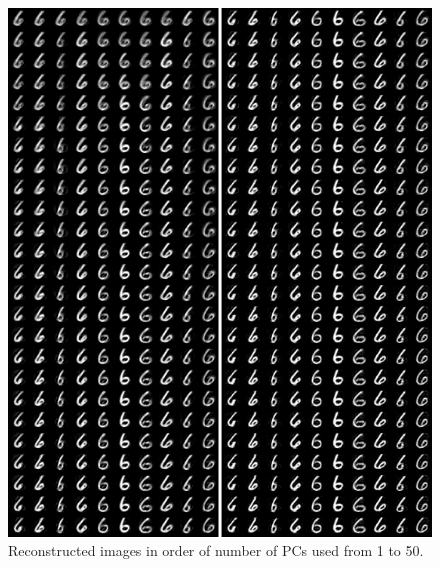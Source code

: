 \documentclass[a4paper,11pt,twocolumn]{article}
\begin{document}
\begin{figure}[!h]
  \centering
  \includegraphics[width=\linewidth]{img/1to50.png}
  \caption{Reconstructed images in order of number of PCs used from 1 to 50.}
  \label{fig:fig7}
\end{figure}
\end{document}
